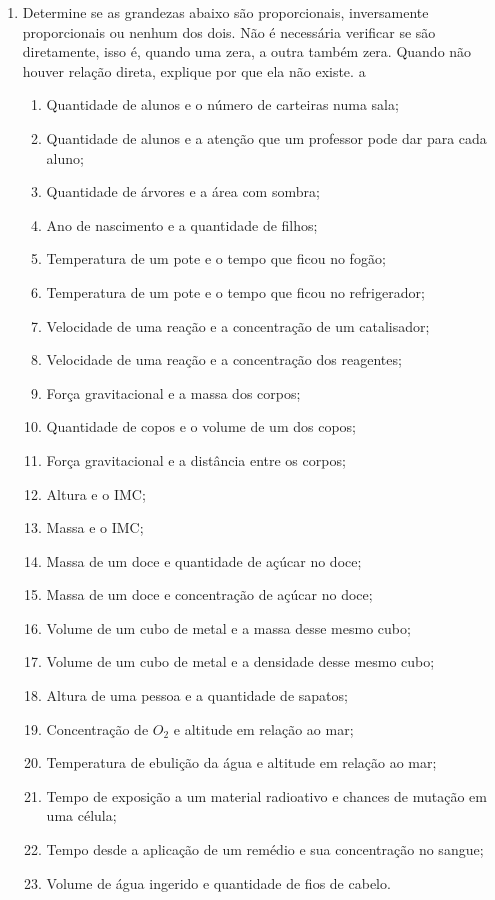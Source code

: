 \documentclass[12pt]{report}
\newcommand{\1}{\faThermometerEmpty}
\newcommand{\2}{\faThermometerQuarter}
\newcommand{\3}{\faThermometerHalf}
\newcommand{\4}{\faThermometerThreeQuarters}
\newcommand{\5}{\faThermometerFull}
\begin{document}
\vspace{5mm}

\begin{enumerate}
\item Determine se as grandezas abaixo são proporcionais, inversamente proporcionais ou nenhum dos dois. Não é necessária verificar se são diretamente, isso é, quando uma zera, a outra também zera. Quando não houver relação direta, explique por que ela não existe. \1 a \2

\begin{enumerate}
    \item Quantidade de alunos e o número de carteiras numa sala;
    \item Quantidade de alunos e a atenção que um professor pode dar para cada aluno;
    \item Quantidade de árvores e a área com sombra;
    \item Ano de nascimento e a quantidade de filhos;
    \item Temperatura de um pote e o tempo que ficou no fogão;
    \item Temperatura de um pote e o tempo que ficou no refrigerador;
    \item Velocidade de uma reação e a concentração de um catalisador;
    \item Velocidade de uma reação e a concentração dos reagentes;
    \item Força gravitacional e a massa dos corpos;
    \item Quantidade de copos e o volume de um dos copos;
    \item Força gravitacional e a distância entre os corpos;
    \item Altura e o IMC;
    \item Massa e o IMC;
    \item Massa de um doce e quantidade de açúcar no doce;
    \item Massa de um doce e concentração de açúcar no doce;
    \item Volume de um cubo de metal e a massa desse mesmo cubo;
    \item Volume de um cubo de metal e a densidade desse mesmo cubo;
    \item Altura de uma pessoa e a quantidade de sapatos;
    \item Concentração de $O_2$ e altitude em relação ao mar;
    \item Temperatura de ebulição da água e altitude em relação ao mar;
    \item Tempo de exposição a um material radioativo e chances de mutação em uma célula;
    \item Tempo desde a aplicação de um remédio e sua concentração no sangue;
    \item Volume de água ingerido e quantidade de fios de cabelo.
    \end{enumerate}



\end{enumerate}
\end{document}
